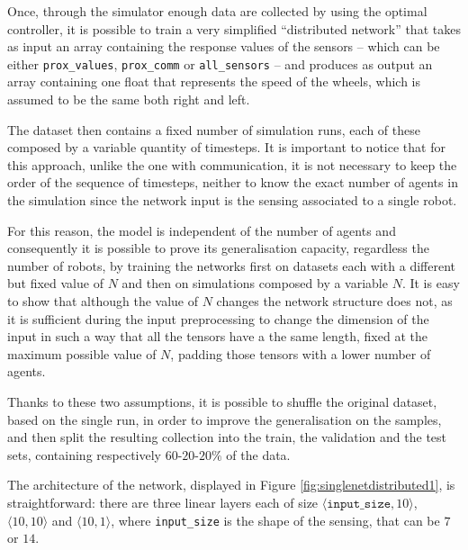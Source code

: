 Once, through the simulator enough data are collected by using the optimal 
controller, it is possible to train a very simplified ``distributed network'' 
that takes as input an array containing the response values of the sensors – 
which can be either \texttt{prox\_values}, \texttt{prox\_comm} or 
\texttt{all\_sensors} – and produces as output an array containing one float 
that represents the speed of the wheels, which is assumed to be the same 
both right and left.

The dataset then contains a fixed number of simulation runs, each of these 
composed by a variable quantity of timesteps. It is important to notice that 
for this approach, unlike the one with communication, it is not necessary to 
keep the order of the sequence of timesteps, neither to know the exact 
number of agents in the simulation since the network input is the sensing 
associated to a single robot.

For this reason, the model is independent of the number of agents and 
consequently it is possible to prove its generalisation capacity, regardless 
the number of robots, by training the networks first on datasets each with a 
different but fixed value of $N$ and then on simulations composed by a 
variable $N$.
It is easy to show that although the value of $N$ changes the network 
structure does not, as it is sufficient during the input preprocessing to 
change the dimension of the input in such a way that all the tensors have a 
the same length, fixed at the maximum possible value of $N$, padding 
those tensors with a lower number of agents.

Thanks to these two assumptions, it is possible to shuffle the original 
dataset, based on the single run, in order to improve the generalisation on 
the samples, and then split the resulting collection into the train, the 
validation and the test sets, containing respectively $60$-$20$-$20\%$ of 
the data. 

The architecture of the network, displayed in Figure 
\ref{fig:singlenetdistributed1}, is straightforward: there are three linear 
layers each of size $\langle\mathtt{input\_size}, 10\rangle$,  $\langle 10, 
10\rangle$ and $\langle 10, 1\rangle$, where \texttt{input\_size} is the 
shape of the sensing, that can be $7$ or $14$.

